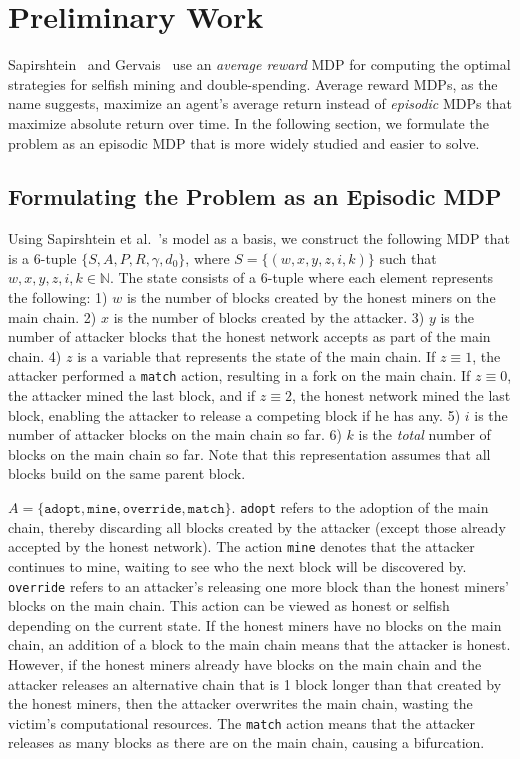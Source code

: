 \section{Preliminary Work}
Sapirshtein~\cite{sapirshtein:2015} and Gervais~\cite{Gervais:2016} use an {\em average reward} MDP for computing the optimal strategies for selfish mining and double-spending. Average reward MDPs, as the name suggests, maximize an agent's average return instead of {\em episodic} MDPs that maximize absolute return over time. In the following section, we formulate the problem as an episodic MDP that is more widely studied and easier to solve.

\subsection{Formulating the Problem as an Episodic MDP}
 Using Sapirshtein et al.~\cite{sapirshtein:2015}'s model as a basis, we construct the following MDP that is a 6-tuple $\{S, A, P, R, \gamma, d_0\}$, where $S = \{(w, x, y, z, i, k)\}$ such that $w, x, y, z, i, k \in \mathbb{N}$. The state consists of a 6-tuple where each element represents the following: 1) $w$ is the number of blocks created by the honest miners on the main chain. 2) $x$ is the number of blocks created by the attacker. 3) $y$ is the number of attacker blocks that the honest network accepts as part of the main chain. 4) $z$ is a variable that represents the state of the main chain. If $z \equiv 1$, the attacker performed a {\tt match} action, resulting in a fork on the main chain. If $z \equiv 0$, the attacker mined the last block, and if $z \equiv 2$, the honest network mined the last block, enabling the attacker to release a competing block if he has any. 5) $i$ is the number of attacker blocks on the main chain so far. 6) $k$ is the {\em total} number of blocks on the main chain so far. Note that this representation assumes that all blocks build on the same parent block.

 $A = \{\texttt{adopt}, \texttt{mine}, \texttt{override}, \texttt{match}\}$. \texttt{adopt} refers to the adoption of the main chain, thereby discarding all blocks created by the attacker (except those already accepted by the honest network). The action \texttt{mine} denotes that the attacker continues to mine, waiting to see who the next block will be discovered by. \texttt{override} refers to an attacker's releasing one more block than the honest miners' blocks on the main chain. This action can be viewed as honest or selfish depending on the current state. If the honest miners have no blocks on the main chain, an addition of a block to the main chain means that the attacker is honest. However, if the honest miners already have blocks on the main chain and the attacker releases an alternative chain that is 1 block longer than that created by the honest miners, then the attacker overwrites the main chain, wasting the victim's computational resources. The \texttt{match} action means that the attacker releases as many blocks as there are on the main chain, causing a bifurcation.


